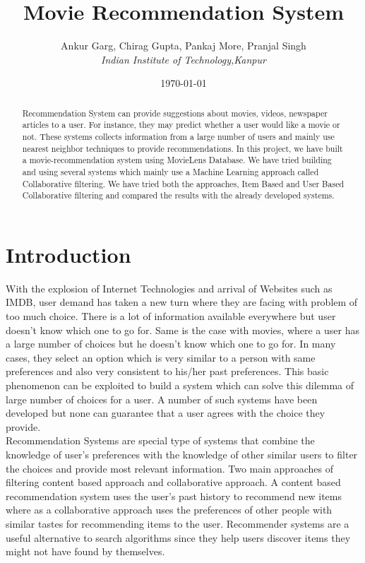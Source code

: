 \documentclass{article}
\title{\Huge{\textbf{Movie Recommendation System}}}
\author{\normalsize Ankur Garg, Chirag Gupta, Pankaj More, Pranjal Singh\\
\emph{Indian Institute of Technology,Kanpur}}
\date{\today}
\begin{document}
\maketitle
\begin{abstract}
Recommendation System can provide suggestions about movies, videos, newspaper articles to a user. For instance, they may predict whether a user would like a movie or not. These systems collects information from a large number of users and mainly use nearest neighbor techniques to provide recommendations. In this project, we have built a movie-recommendation system using MovieLens Database. We have tried building and using several systems which mainly use a Machine Learning approach called Collaborative filtering. We have tried both the approaches, Item Based and User Based Collaborative filtering and compared the results with the already developed systems.
\end{abstract}

\section{Introduction}
With the explosion of Internet Technologies and arrival of Websites such as IMDB, user demand has taken a new turn where they are facing with problem of too much choice. There is a lot of information available everywhere but user doesn't know which one to go for. Same is the case with movies, where a user has a large number of choices but he doesn't know which one to go for. In many cases, they select an option which is very similar to a person with same preferences and also very consistent to his/her past preferences. This basic phenomenon can be exploited to build a system which can solve this dilemma of large number of choices for a user. A number of such systems have been developed but none can guarantee that a user agrees with the choice they provide.\\ 

Recommendation Systems are special type of systems that combine the knowledge of user's preferences with the knowledge of other similar users to filter the choices and provide most relevant information. Two main approaches of filtering content based approach and collaborative approach. A content based recommendation system uses the user’s past history to recommend new items where as a collaborative approach uses the preferences of other people with similar tastes for recommending items to the user. Recommender systems are a useful alternative to search algorithms since they help users discover items they might not have found by themselves.\\ 
\end{document}
